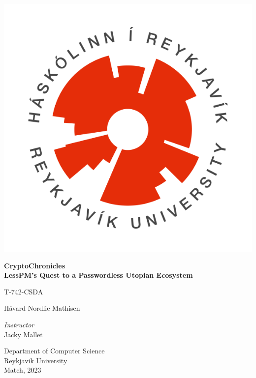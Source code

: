 \documentclass{article}
\title{\titleHeading}
\author{Håvard Nordlie Mathisen}
\date{January, 2023}
\newcommand{\jacky}{Jacky Mallet}
\newcommand{\secu}{T-742-CSDA}
\newcommand{\titleHeading}{CryptoChronicles}
\newcommand{\titleSubheading}{LessPM's Quest to a Passwordless Utopian Ecosystem}
\newcommand{\subjectName}{\secu}
\newcommand{\instructorName}{\jacky}
\begin{document}
    \begin{titlepage}
        \begin{center}
            \includegraphics[scale=0.4]{images/HR_logo_hringur_transparent}

            \huge
            \textbf{\titleHeading}\\
            \Large
            \textbf{\titleSubheading}

            \vspace{1cm}
            \large
            \subjectName

            \vspace{0.5cm}
            \Large
            Håvard Nordlie Mathisen


            \vfill

            \normalsize
            \textit{Instructor}\\
            \instructorName

            \vspace{0.8cm}

            Department of Computer Science\\
            Reykjavik University\\
            Match, 2023\\

        \end{center}
    \end{titlepage}
\end{document}
